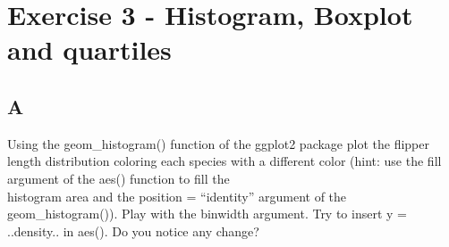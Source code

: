 \documentclass[
]{article}
\newenvironment{Shaded}{\begin{snugshade}}{\end{snugshade}}
\newcommand{\AttributeTok}[1]{\textcolor[rgb]{0.13,0.29,0.53}{#1}}
\newcommand{\DecValTok}[1]{\textcolor[rgb]{0.00,0.00,0.81}{#1}}
\newcommand{\FunctionTok}[1]{\textcolor[rgb]{0.13,0.29,0.53}{\textbf{#1}}}
\newcommand{\NormalTok}[1]{#1}
\newcommand{\SpecialCharTok}[1]{\textcolor[rgb]{0.81,0.36,0.00}{\textbf{#1}}}
\newcommand{\StringTok}[1]{\textcolor[rgb]{0.31,0.60,0.02}{#1}}
\begin{document}
\hypertarget{exercise-3---histogram-boxplot-and-quartiles}{%
\section{Exercise 3 - Histogram, Boxplot and
quartiles}\label{exercise-3---histogram-boxplot-and-quartiles}}

\hypertarget{a-2}{%
\subsection{A}\label{a-2}}

Using the geom\_histogram() function of the ggplot2 package plot the
flipper length distribution coloring each species with a different color
(hint: use the fill argument of the aes() function to fill the\\
histogram area and the position = ``identity'' argument of the
geom\_histogram()). Play with the binwidth argument. Try to insert y =
..density.. in aes(). Do you notice any change?

\begin{Shaded}
\end{Shaded}
\end{document}
